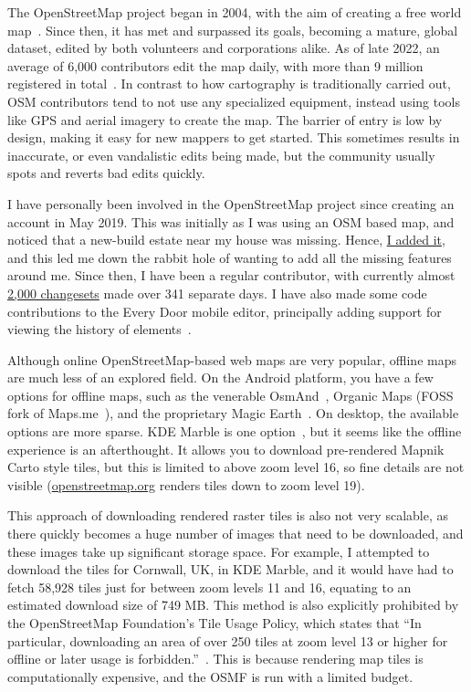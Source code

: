The OpenStreetMap project began in 2004, with the aim of creating a free world map~\cite{RAMM:2011}. Since then, it has met and surpassed its goals, becoming a mature, global dataset, edited by both volunteers and corporations alike. As of late 2022, an average of 6,000 contributors edit the map daily, with more than 9 million registered in total~\cite{OSMStats}. In contrast to how cartography is traditionally carried out, OSM contributors tend to not use any specialized equipment, instead using tools like GPS and aerial imagery to create the map. The barrier of entry is low by design, making it easy for new mappers to get started. This sometimes results in inaccurate, or even vandalistic edits being made, but the community usually spots and reverts bad edits quickly.

I have personally been involved in the OpenStreetMap project since creating an account in May 2019. This was initially as I was using an OSM based map, and noticed that a new-build estate near my house was missing. Hence, \href{https://www.openstreetmap.org/changeset/70609319}{I added it}, and this led me down the rabbit hole of wanting to add all the missing features around me. Since then, I have been a regular contributor, with currently almost \href{https://www.openstreetmap.org/user/GeorgeHoneywood}{2,000 changesets} made over 341 separate days. I have also made some code contributions to the Every Door mobile editor, principally adding support for viewing the history of elements~\cite{every-door}. 

Although online OpenStreetMap-based web maps are very popular, offline maps are much less of an explored field. On the Android platform, you have a few options for offline maps, such as the venerable OsmAnd~\cite{osmand}, Organic Maps (FOSS fork of Maps.me~\cite{maps.me}), and the proprietary Magic Earth~\cite{magic-earth}. On desktop, the available options are more sparse. KDE Marble is one option~\cite{kde-marble}, but it seems like the offline experience is an afterthought. It allows you to download pre-rendered Mapnik Carto style tiles, but this is limited to above zoom level 16, so fine details are not visible (\href{https://openstreetmap.org}{openstreetmap.org} renders tiles down to zoom level 19).

This approach of downloading rendered raster tiles is also not very scalable, as there quickly becomes a huge number of images that need to be downloaded, and these images take up significant storage space. For example, I attempted to download the tiles for Cornwall, UK, in KDE Marble, and it would have had to fetch 58,928 tiles just for between zoom levels 11 and 16, equating to an estimated download size of 749 MB\@. This method is also explicitly prohibited by the OpenStreetMap Foundation's Tile Usage Policy, which states that ``In particular, downloading an area of over 250 tiles at zoom level 13 or higher for offline or later usage is forbidden.''~\cite{OSMF-tile-usage-policy}. This is because rendering map tiles is computationally expensive, and the OSMF is run with a limited budget.

